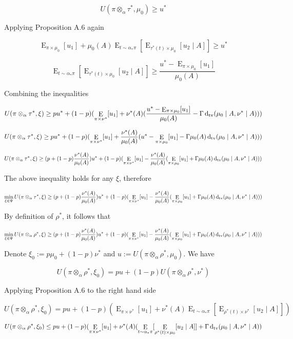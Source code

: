 \documentclass[a4paper]{article}
\DeclareMathOperator{\E}{E}
\newcommand{\Dtv}{\operatorname{d}_{\textnormal{tv}}}
\begin{document}
$$U(\pi \otimes_\alpha \tau^*, \mu_0) \geq u^*$$

Applying Proposition A.6 again

$$\E_{\pi \times \mu_0}[u_1] + \mu_0(A)\E_{t \sim \alpha_* \pi}[\E_{\tau^*(t) \times \mu_0}[u_2 \mid A]] \geq u^*$$

$$\E_{t \sim \alpha_* \pi}[\E_{\tau^*(t) \times \mu_0}[u_2 \mid A]] \geq \frac{u^* - \E_{\pi \times \mu_0}[u_1]}{\mu_0(A)}$$

Combining the inequalities

$$U(\pi \otimes_\alpha \tau^*, \xi) \geq pu^* + (1-p) (\E_{\pi \times \nu^*}[u_1] + \nu^*(A)(\frac{u^* - \E_{\pi \times \mu_0}[u_1]}{\mu_0(A)}- \Gamma\Dtv(\mu_0 \mid A, \nu^* \mid A)))$$

$$U(\pi \otimes_\alpha \tau^*, \xi) \geq pu^* + (1-p) (\E_{\pi \times \nu^*}[u_1] + \frac{\nu^*(A)}{\mu_0(A)}(u^* - \E_{\pi \times \mu_0}[u_1]- \Gamma\mu_0(A)\Dtv(\mu_0 \mid A, \nu^* \mid A)))$$

$$U(\pi \otimes_\alpha \tau^*, \xi) \geq (p + (1-p) \frac{\nu^*(A)}{\mu_0(A)})u^* + (1-p) (\E_{\pi \times \nu^*}[u_1] - \frac{\nu^*(A)}{\mu_0(A)}(\E_{\pi \times \mu_0}[u_1]+ \Gamma\mu_0(A)\Dtv(\mu_0 \mid A, \nu^* \mid A)))$$

The above inequality holds for any ${\xi}$, therefore

$$\min_{\xi \in \Psi} U(\pi \otimes_\alpha \tau^*, \xi) \geq (p + (1-p) \frac{\nu^*(A)}{\mu_0(A)})u^* + (1-p) (\E_{\pi \times \nu^*}[u_1] - \frac{\nu^*(A)}{\mu_0(A)}(\E_{\pi \times \mu_0}[u_1]+ \Gamma\mu_0(A)\Dtv(\mu_0 \mid A, \nu^* \mid A)))$$

By definition of ${\rho^*}$, it follows that

$$\min_{\xi \in \Psi} U(\pi \otimes_\alpha \rho^*, \xi) \geq (p + (1-p) \frac{\nu^*(A)}{\mu_0(A)})u^* + (1-p) (\E_{\pi \times \nu^*}[u_1] - \frac{\nu^*(A)}{\mu_0(A)}(\E_{\pi \times \mu_0}[u_1]+ \Gamma\mu_0(A)\Dtv(\mu_0 \mid A, \nu^* \mid A)))$$

Denote ${\xi_0:= p \mu_0 + (1-p) \nu^*}$ and ${u:=U(\pi \otimes_\alpha \rho^*, \mu_0)}$. We have

$$U(\pi \otimes_\alpha \rho^*, \xi_0) = pu + (1-p) U(\pi \otimes_\alpha \rho^*, \nu^*)$$

Applying Proposition A.6 to the right hand side

$$U(\pi \otimes_\alpha \rho^*, \xi_0) = pu + (1-p) (\E_{\pi \times \nu^*}[u_1] + \nu^*(A)\E_{t \sim \alpha_* \pi}[\E_{\rho^*(t) \times \nu^*}[u_2 \mid A]])$$

$$U(\pi \otimes_\alpha \rho^*, \xi_0) \leq pu + (1-p) (\E_{\pi \times \nu^*}[u_1] + \nu^*(A)(\E_{t \sim \alpha_* \pi}[\E_{\rho^*(t) \times \mu_0}[u_2 \mid A]]+\Gamma \Dtv(\mu_0 \mid A, \nu^* \mid A))$$
\end{document}
